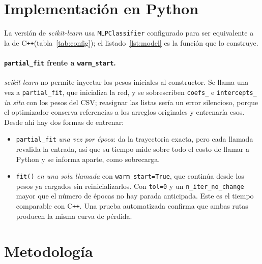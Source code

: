 \documentclass[11pt,a4paper]{article}
\newcommand{\cpp}{C\texttt{++}\xspace}
\newcommand{\sk}{\textit{scikit-learn}\xspace}
\begin{document}
\section{Implementaci\'on en Python}
La versi\'on de \sk usa \texttt{MLPClassifier} configurado para ser equivalente a la de \cpp (tabla~\ref{tab:config}); el listado~\ref{lst:model} es la funci\'on que lo construye.

\begin{table}[tbp]\centering\small
\caption{Configuraci\'on de equivalencia. La columna de \sk se lee del objeto real.}\label{tab:config}

\end{table}



\paragraph{\texttt{partial\_fit} frente a \texttt{warm\_start}.} \sk no permite inyectar los pesos iniciales al constructor. Se llama una vez a \texttt{partial\_fit}, que inicializa la red, y se sobrescriben \texttt{coefs\_} e \texttt{intercepts\_} \emph{in situ} con los pesos del CSV; reasignar las listas ser\'ia un error silencioso, porque el optimizador conserva referencias a los arreglos originales y entrenar\'ia esos. Desde ah\'i hay dos formas de entrenar:
\begin{itemize}
\item \texttt{partial\_fit} \emph{una vez por \'epoca}: da la trayectoria exacta, pero cada llamada revalida la entrada, as\'i que su tiempo mide sobre todo el costo de llamar a Python y se informa aparte, como sobrecarga.
\item \texttt{fit()} \emph{en una sola llamada} con \texttt{warm\_start=True}, que contin\'ua desde los pesos ya cargados sin reinicializarlos. Con \texttt{tol=0} y un \texttt{n\_iter\_no\_change} mayor que el n\'umero de \'epocas no hay parada anticipada. Este es el tiempo comparable con \cpp. Una prueba automatizada confirma que ambas rutas producen la misma curva de p\'erdida.
\end{itemize}

\section{Metodolog\'ia}
\end{document}
